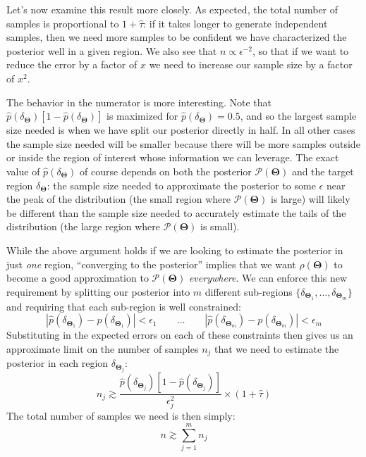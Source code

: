 \documentclass[12pt, titlepage]{article}
\newcommand{\params}{\ensuremath{\boldsymbol\Theta}}
\newcommand{\posterior}{\ensuremath{\mathcal{P}}}
\begin{document}
Let's now examine this result more closely. As expected,
the total number of samples is proportional
to $1 + \hat{\tau}$: if it takes longer to generate independent
samples, then we need more samples to be confident we have characterized
the posterior well in a given region. 
We also see that $n \propto \epsilon^{-2}$, so that
if we want to reduce the error by a factor of $x$ we need
to increase our sample size by a factor of $x^2$.

The behavior in the numerator is more interesting. Note
that $\hat{p}(\delta_{\params}) \left[1 - \hat{p}(\delta_{\params})\right]$
is maximized for $\hat{p}(\delta_{\params}) = 0.5$, and so the largest
sample size needed is when we have split our posterior directly in half.
In all other cases the sample size needed will be smaller because
there will be more samples outside or inside the region of interest
whose information we can leverage. The exact value of $\hat{p}(\delta_{\params})$
of course depends on both the posterior $\posterior(\params)$
and the target region $\delta_{\params}$: the sample size needed to approximate
the posterior to some $\epsilon$ 
near the peak of the distribution (the small region where $\posterior(\params)$ is large)
will likely be different than
the sample size needed to accurately estimate the tails of the
distribution (the large region where $\posterior(\params)$ is small).

While the above argument holds if we are looking to estimate the
posterior in just \textit{one} region, ``converging to the posterior''
implies that we want $\rho(\params)$
to become a good approximation to $\posterior(\params)$ \textit{everywhere}.
We can enforce this new requirement by splitting our posterior into $m$
different sub-regions $\{ \delta_{\params_1}, \dots, \delta_{\params_m} \}$ 
and requiring that each sub-region is well constrained:
\begin{equation}
    |\hat{p}(\delta_{\params_1}) - p(\delta_{\params_1})| < \epsilon_1
    \quad\quad \dots \quad\quad
    |\hat{p}(\delta_{\params_m}) - p(\delta_{\params_m})| < \epsilon_m
\end{equation}
Substituting in the expected errors on each of these
constraints then gives us an approximate limit
on the number of samples $n_j$ that we need
to estimate the posterior in each region $\delta_{\params_j}$:
\begin{equation}
    n_j \gtrsim \frac{\hat{p}(\delta_{\params_j}) 
    \left[1 - \hat{p}(\delta_{\params_j})\right]}
    {\epsilon_j^2} \times (1+\hat{\tau})
\end{equation}
The total number of samples we need is then simply:
\begin{equation}
    n \gtrsim 
    \sum_{j=1}^{m} n_j
\end{equation}
\end{document}
